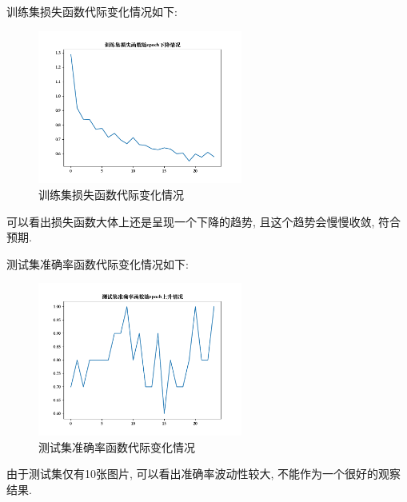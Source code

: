训练集损失函数代际变化情况如下:

\begin{figure}[H]
    \centering
    \includegraphics[width=0.6\textwidth]{figures/train-loss}
    \caption{训练集损失函数代际变化情况}
\end{figure}

可以看出损失函数大体上还是呈现一个下降的趋势, 且这个趋势会慢慢收敛, 符合预期.

测试集准确率函数代际变化情况如下:

\begin{figure}[H]
    \centering
    \includegraphics[width=0.6\textwidth]{figures/test-acc}
    \caption{测试集准确率函数代际变化情况}
\end{figure}

由于测试集仅有10张图片, 可以看出准确率波动性较大, 不能作为一个很好的观察结果.